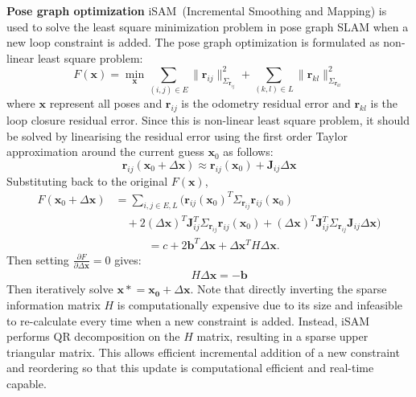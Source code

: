 \noindent \textbf{Pose graph optimization}\hspace{0.5em} iSAM~\cite{Kaess2012}(Incremental Smoothing and Mapping) is used to solve the least square minimization problem in pose graph SLAM when a new loop constraint is added. The pose graph optimization is formulated as non-linear least square problem:
\begin{equation}
  F(\mathbf{x}) = \min_{\mathbf{x}} \sum_{(i,j) \in E} \| \mathbf{r}_{ij} \|_{\Sigma_{\mathbf{r}_{ij}}}^2 + \sum_{(k,l) \in L} \| \mathbf{r}_{kl} \|_{\Sigma_{\mathbf{r}_{kl}}}^2
\end{equation}  
where $\textbf{x}$ represent all poses and $\mathbf{r}_{ij}$ is the odometry residual error and $\mathbf{r}_{kl}$ is the loop closure residual error. Since this is non-linear least square problem, it should be solved by linearising the residual error using the first order Taylor approximation around the current guess $\mathbf{x}_0$ as follows: 
\begin{equation}
  \mathbf{r}_{ij}(\mathbf{x}_0 + \Delta \mathbf{x}) \approx \mathbf{r}_{ij}(\mathbf{x}_0) + \mathbf{J}_{ij} \Delta \mathbf{x} 
\end{equation}
Substituting back to the original $F(\mathbf{x})$, 
\begin{equation}
  \begin{aligned}
      F(\mathbf{x}_0 + \Delta \mathbf{x}) &= \sum\limits_{i,j \in E,L} \biggl( \mathbf{r}_{ij}(\mathbf{x}_0)^T \Sigma_{\mathbf{r}_{ij}} \mathbf{r}_{ij}(\mathbf{x}_0) \\
      &\quad + 2 (\Delta \mathbf{x})^T \mathbf{J}_{ij}^T \Sigma_{\mathbf{r}_{ij}} \mathbf{r}_{ij}(\mathbf{x}_0) + (\Delta \mathbf{x})^T \mathbf{J}_{ij}^T \Sigma_{\mathbf{r}_{ij}} \mathbf{J}_{ij} \Delta \mathbf{x} \biggr)
  \end{aligned}
  \end{equation}
  \begin{equation}
  \begin{aligned}
      &= c + 2\mathbf{b}^T\Delta \mathbf{x} + \Delta \mathbf{x}^T H \Delta \mathbf{x}.
  \end{aligned}
\end{equation}
Then setting $\frac{\partial F}{\partial \Delta \mathbf{x}}=0$ gives:
\begin{equation}
  \begin{aligned}
  &\quad H \Delta \mathbf{x} = -\mathbf{b} 
  \end{aligned}
\end{equation}
Then iteratively solve $\mathbf{x*}=\mathbf{x_0} + \Delta \mathbf{x}$. Note that directly inverting the sparse information matrix $H$ is computationally expensive due to its size and infeasible to re-calculate every time when a new constraint is added. Instead, iSAM performs QR decomposition on the $H$ matrix, resulting in a sparse upper triangular matrix. This allows efficient incremental addition of a new constraint and reordering so that this update is computational efficient and real-time capable.  

